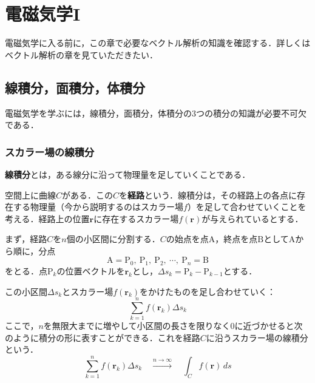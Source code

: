 \chapter{電磁気学I}
\setcounter{page}{1}


電磁気学に入る前に，この章で必要なベクトル解析の知識を確認する．詳しくはベクトル解析の章を見ていただきたい．



\section{線積分，面積分，体積分}

電磁気学を学ぶには，線積分，面積分，体積分の3つの積分の知識が必要不可欠である．



\subsection{スカラー場の線積分}

\textbf{線積分}とは，ある線分に沿って物理量を足していくことである．

空間上に曲線$C$がある．この$C$を\textbf{経路}という．線積分は，その経路上の各点に存在する物理量（今から説明するのはスカラー場$f$）を足して合わせていくことを考える．経路上の位置$\bm{r}$に存在するスカラー場$f(\bm{r})$が与えられているとする．

まず，経路$C$を$n$個の小区間に分割する．$C$の始点を点$\mathrm{A}$，終点を点$\mathrm{B}$として$\mathrm{A}$から順に，分点
\begin{equation*}
	\mathrm{A} = \mathrm{P}_0,\ \mathrm{P}_1,\ \mathrm{P}_2,\ \cdots,\ \mathrm{P}_n = \mathrm{B}
\end{equation*}
をとる．点$\mathrm{P}_k$の位置ベクトルを$\bm{r}_k$とし，$\varDelta s_k = \mathrm{P}_k - \mathrm{P}_{k - 1}$とする．

この小区間$\varDelta s_k$とスカラー場$f(\bm{r}_k)$をかけたものを足し合わせていく：
\begin{equation*}
	\sum_{k = 1}^{n} f(\bm{r}_k)\varDelta s_k
\end{equation*}
ここで，$n$を無限大までに増やして小区間の長さを限りなく0に近づかせると次のように積分の形に表すことができる．これを経路$C$に沿うスカラー場の線積分という．
\begin{equation}
	\sum_{k = 1}^{n} f(\bm{r}_k)\varDelta s_k \quad\xrightarrow{n \to \infty}\quad \int_{C} f(\bm{r})\,ds
\end{equation}



